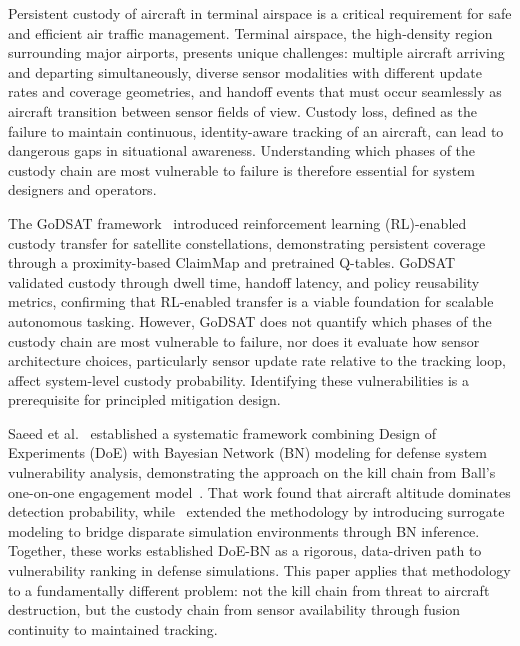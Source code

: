 \documentclass[]{spie}
\begin{document}
Persistent custody of aircraft in terminal airspace is a critical requirement for safe and efficient air traffic management. Terminal airspace, the high-density region surrounding major airports, presents unique challenges: multiple aircraft arriving and departing simultaneously, diverse sensor modalities with different update rates and coverage geometries, and handoff events that must occur seamlessly as aircraft transition between sensor fields of view. Custody loss, defined as the failure to maintain continuous, identity-aware tracking of an aircraft, can lead to dangerous gaps in situational awareness. Understanding which phases of the custody chain are most vulnerable to failure is therefore essential for system designers and operators.

The GoDSAT framework~\cite{Saeed2026GoDSATRL} introduced reinforcement learning (RL)-enabled custody transfer for satellite constellations, demonstrating persistent coverage through a proximity-based ClaimMap and pretrained Q-tables. GoDSAT validated custody through dwell time, handoff latency, and policy reusability metrics, confirming that RL-enabled transfer is a viable foundation for scalable autonomous tasking. However, GoDSAT does not quantify which phases of the custody chain are most vulnerable to failure, nor does it evaluate how sensor architecture choices, particularly sensor update rate relative to the tracking loop, affect system-level custody probability. Identifying these vulnerabilities is a prerequisite for principled mitigation design.

Saeed et al.~\cite{Saeed2025DOEFramework} established a systematic framework combining Design of Experiments (DoE) with Bayesian Network (BN) modeling for defense system vulnerability analysis, demonstrating the approach on the kill chain from Ball's one-on-one engagement model~\cite{Ball2003}. That work found that aircraft altitude dominates detection probability, while~\cite{Saeed2025BNDOE} extended the methodology by introducing surrogate modeling to bridge disparate simulation environments through BN inference. Together, these works established DoE-BN as a rigorous, data-driven path to vulnerability ranking in defense simulations. This paper applies that methodology to a fundamentally different problem: not the kill chain from threat to aircraft destruction, but the custody chain from sensor availability through fusion continuity to maintained tracking.
\end{document}
